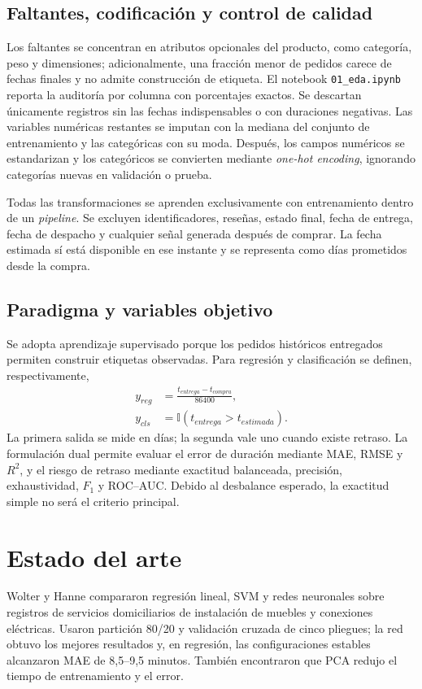 \documentclass[journal]{IEEEtran}
\begin{document}
\subsection{Faltantes, codificación y control de calidad}
Los faltantes se concentran en atributos opcionales del producto, como categoría, peso y dimensiones; adicionalmente, una fracción menor de pedidos carece de fechas finales y no admite construcción de etiqueta. El notebook \texttt{01\_eda.ipynb} reporta la auditoría por columna con porcentajes exactos. Se descartan únicamente registros sin las fechas indispensables o con duraciones negativas. Las variables numéricas restantes se imputan con la mediana del conjunto de entrenamiento y las categóricas con su moda. Después, los campos numéricos se estandarizan y los categóricos se convierten mediante \emph{one-hot encoding}, ignorando categorías nuevas en validación o prueba.

Todas las transformaciones se aprenden exclusivamente con entrenamiento dentro de un \emph{pipeline}. Se excluyen identificadores, reseñas, estado final, fecha de entrega, fecha de despacho y cualquier señal generada después de comprar. La fecha estimada sí está disponible en ese instante y se representa como días prometidos desde la compra.

\subsection{Paradigma y variables objetivo}
Se adopta aprendizaje supervisado porque los pedidos históricos entregados permiten construir etiquetas observadas. Para regresión y clasificación se definen, respectivamente,
\begin{equation}
\begin{aligned}
y_{reg}&=\frac{t_{entrega}-t_{compra}}{86400},\\
y_{cls}&=\mathbb{I}(t_{entrega}>t_{estimada}).
\end{aligned}
\end{equation}
La primera salida se mide en días; la segunda vale uno cuando existe retraso. La formulación dual permite evaluar el error de duración mediante MAE, RMSE y $R^2$, y el riesgo de retraso mediante exactitud balanceada, precisión, exhaustividad, $F_1$ y ROC--AUC. Debido al desbalance esperado, la exactitud simple no será el criterio principal.

\section{Estado del arte}
Wolter y Hanne \cite{wolter2024} compararon regresión lineal, SVM y redes neuronales sobre registros de servicios domiciliarios de instalación de muebles y conexiones eléctricas. Usaron partición 80/20 y validación cruzada de cinco pliegues; la red obtuvo los mejores resultados y, en regresión, las configuraciones estables alcanzaron MAE de 8,5--9,5 minutos. También encontraron que PCA redujo el tiempo de entrenamiento y el error.
\end{document}
